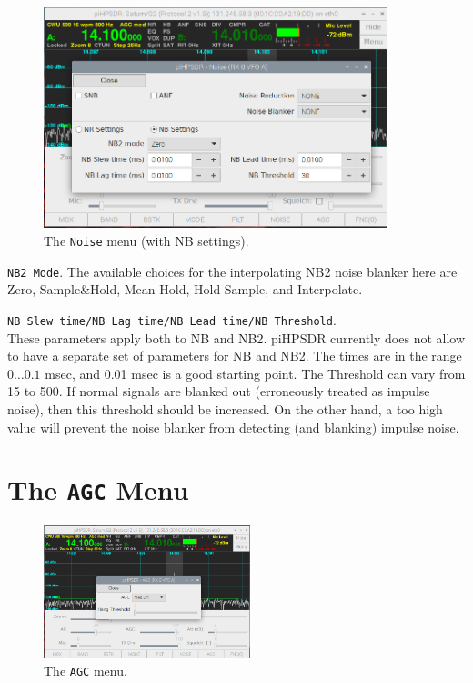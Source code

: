 \documentclass[12pt]{book}
\def\rett#1{\texttt{\color{red}#1}}
\def\bltt#1{\texttt{\color{blue}#1}}
\def\pH{pi\-HPSDR }
\begin{document}
\begin{figure}[ht]
\center
\includegraphics[width=10cm]{NoiseMenu2.png}
\caption{The \bltt{Noise} menu (with NB settings).}
\label{fig:NoiseMenu2}
\end{figure}
\rett{NB2 Mode}. The available choices for the interpolating NB2 noise blanker here are Zero,
Sample\&Hold, Mean Hold, Hold Sample, and Interpolate.

\rett{NB Slew time/NB Lag time/NB Lead time/NB Threshold}.\\
 These parameters apply both to NB and NB2.
\pH currently does not allow to have a separate set of parameters for NB and NB2.
The times are in the range $0\ldots0.1$ msec, and 0.01 msec is a good starting point. The Threshold
can vary from 15 to 500. If normal signals are blanked out (erroneously treated as impulse noise),
then this threshold should be increased. On the other hand, a too high value will prevent the
noise blanker from detecting (and blanking) impulse noise.


\section{The \texttt{AGC} Menu}

\begin{figure}[ht]
\center
\includegraphics[width=6cm]{AGCMenu.png}
\caption{The \bltt{AGC} menu.}
\label{fig:AGCMenu}
\end{figure}
\end{document}

